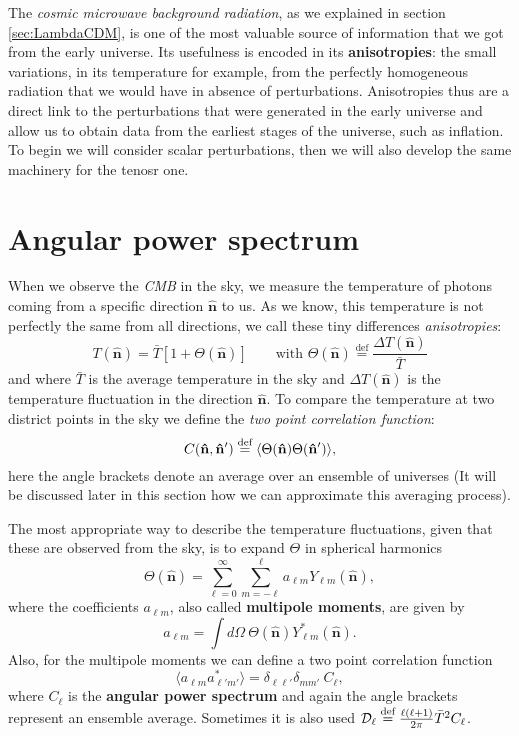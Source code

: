 The \emph{cosmic microwave background radiation}, as we explained in section \ref{sec:LambdaCDM}, is one of the most valuable source of information that we got from the early universe. Its usefulness is encoded in its \textbf{anisotropies}: the small variations, in its temperature for example, from the perfectly homogeneous radiation that we would have in absence of perturbations. Anisotropies thus are a direct link to the perturbations that were generated in the early universe and allow us to obtain data from the earliest stages of the universe, such as inflation. To begin we will consider scalar perturbations, then we will also develop the same machinery for the tenosr one.
\section{Angular power spectrum}\label{sec:AngularPowerSpectrum}
When we observe the \emph{CMB} in the sky, we measure the temperature of photons coming from a specific direction $\mathbf{\hat{n}}$ to us. As we know, this temperature is not perfectly the same from all directions, we call these tiny differences \emph{anisotropies}:
$$T(\mathbf{\hat{n}}) = \bar{T} \left[1 + \Theta(\mathbf{\hat{n}})\right] \qquad \text{with } \Theta(\mathbf{\hat{n}}) \stackrel{\text{def}}{=} \frac{\Delta T(\mathbf{\hat{n}})}{\bar{T}}$$
and where $\bar{T}$ is the average temperature in the sky and $\Delta T(\mathbf{\hat{n}})$ is the temperature fluctuation in the direction $\mathbf{\hat{n}}$.
To compare the temperature at two district points in the sky we define the \emph{two point correlation function}:
\begin{equation} \label{eq:ani2pcf}
    C(\mathbf{\hat{n}},\mathbf{\hat{n}}') \stackrel{\text{def}}{=} \langle \Theta(\mathbf{\hat{n}})\Theta(\mathbf{\hat{n}}') \rangle,
\end{equation}
here the angle brackets denote an average over an ensemble of universes (It will be discussed later in this section how we can approximate this averaging process).


The most appropriate way to describe the temperature fluctuations, given that these are observed from the sky, is to expand $\Theta$ in spherical harmonics
\begin{equation}\label{eq:harmexpansion}
    \Theta(\mathbf{\hat{n}}) = \sum_{\ell=0}^{\infty} \sum_{m=-\ell}^{\ell} a_{\ell m} Y_{\ell m}(\mathbf{\hat{n}}),
\end{equation}
where the coefficients $a_{\ell m}$, also called \textbf{multipole moments}, are given by
\begin{equation*}
    a_{\ell m} = \int d\Omega\ \Theta(\mathbf{\hat{n}}) Y^*_{\ell m}(\mathbf{\hat{n}}).
\end{equation*}
Also, for the multipole moments we can define a two point correlation function
\begin{equation}\label{eq:angularpowerspectrum}
    \langle a_{\ell m} a^*_{\ell' m'} \rangle = \delta_{\ell \ell'} \delta_{m m'}\ C_{\ell},
\end{equation}
where $C_{\ell}$ is the \textbf{angular power spectrum} and again the angle brackets represent an ensemble average. Sometimes it is also used $\mathcal{D}_\ell \stackrel{\text{def}}{=} \frac{\ell(\ell+1)}{2\pi}\bar{T}^2C_{\ell}$.

